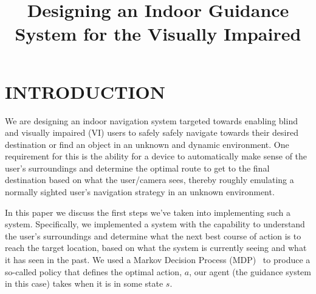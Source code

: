 \documentclass[a4paper, twoside]{article}
\begin{document}
\title{Designing an Indoor Guidance System for the Visually Impaired} 

\author{
}



\onecolumn \maketitle \normalsize \vfill

\section{\uppercase{Introduction}}

\noindent We are designing an indoor navigation system targeted towards enabling blind and visually impaired (VI) users to safely safely navigate towards their desired destination or find an object in an unknown and dynamic environment. One requirement for this is the ability for a device to automatically make sense of the user's surroundings and determine the optimal route to get to the final destination based on what the user/camera sees, thereby roughly emulating a normally sighted user's navigation strategy in an unknown environment.

In this paper we discuss the first steps we've taken into implementing such a system. Specifically, we implemented a system with the capability to understand the user's surroundings and determine what the next best course of action is to reach the target location, based on what the system is currently seeing and what it has seen in the past. We used a Markov Decision Process (MDP)~\cite{bellman1957markovian} to produce a so-called policy that defines the optimal action, $a$, our agent (the guidance system in this case) takes when it is in some state $s$.  
\end{document}
